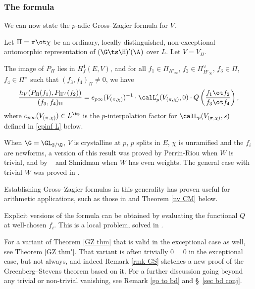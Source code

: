 \subsubsection{The formula}   We can now state the $p$-adic Gross--Zagier formula for $V$.
\begin{theoA}\label{GZ thm} Let $\Pi=\pi\ot \chi$ be an ordinary, locally distinguished, non-exceptional automorphic  representation of $(\G\ts\H)'(\A^{})$ over $L$.
 Let $V=V_{\Pi}$.


  The image of $P_{\Pi}$ lies in $H^{1}_{f}(E, V)$, and
for all $f_{1}\in \Pi_{H'_{\infty}}$, $f_{2}\in\Pi^{\vee}_{H'_{{\infty}}}$, $f_{3}\in \Pi$, $f_{4}\in\Pi^{\vee}$
such that $(f_{3}, f_{4})_{\Pi}\neq 0$, we have
$$   {  h_{V}(P_{\Pi}(f_{1}), P_{\Pi^{\vee}}(f_{2}))    \over   (f_{3}, f_{4})_{\Pi} }
=
e_{p\infty}(V_{(\pi, \chi)})^{-1}
 \cdot \calL_{p}'(V_{(\pi, \chi)}, 0)
\cdot
Q\left( {  f_{1} \ot  f_{2}\over f_{3}\ot f_{4}}\right),
$$
where $e_{p\infty}(V_{(\pi, \chi)}) \in L^{\ts}$ is  the $p$-interpolation factor  for  $\calL_{p}(V_{(\pi ,\chi)}, s)$ defined in \eqref{epinf L} below.
\end{theoA}
 When $\G=\GL_{2/\Q}$, $V$ is crystalline at $p$, $p$ splits in $E$,   $\chi$ is unramified  and the $f_{i}$  are newforms, a version of this result was proved by Perrin-Riou \cite{pr} when $W$ is trivial, and by   \nek\ \cite{nek-heeg} and Shnidman \cite{shnidman} when $W$ has even weights. The general case with trivial $W$ was proved in \cite{dd-pyzz,nonsplit}.
\begin{rema}
\notready Establishing Gross--Zagier formulas in this generality has proven useful for arithmetic applications, such as those in  \cite{tian,bur-d,BuTian} and Theorem \ref{nv CM} below.


Explicit versions of the formula can be obtained by evaluating the functional $Q$  at well-chosen $f_{i}$. This is a local problem, solved in  \cite{cst}.
\end{rema}


\begin{rema}
\notready For a variant of Theorem \ref{GZ thm} that is valid  in the exceptional case as well, see Theorem \ref{GZ thm'}. That variant is often trivially  $0=0$ in the exceptional case, but not always, and indeed Remark \ref{rmk GS} sketches a new proof of the Greenberg--Stevens theorem \cite{GS} based on it. For a further discussion going beyond any trivial or non-trivial vanishing, see Remark \ref{go to bd} and \S~\ref{sec bd conj}.
\end{rema}

